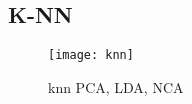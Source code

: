 
\subsection{K-NN}%
\label{sub:knn}
\begin{figure}[H]
    \centering
    \texttt{[image: knn]}
    \caption{knn PCA, LDA, NCA}%
    \label{fig:svm_linear_C_cv}
\end{figure}
